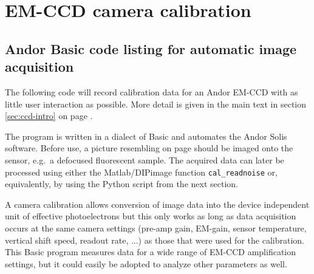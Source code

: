 \chapter{EM-CCD camera calibration}
\section{Andor Basic code listing for automatic image acquisition}
\label{sec:basic-acquisition}


The following code will record calibration data for an Andor EM-CCD
with as little user interaction as possible. More detail is given in
the main text in section \ref{sec:ccd-intro} on page
\pageref{sec:ccd-intro}.

The program is written in a dialect of Basic and automates the Andor Solis software.
Before use, a picture resembling
 on page \pageref{fig:shot-noise} should be
imaged onto the sensor, e.g.\ a defocused fluorescent sample. The
acquired data can later be processed using either the Matlab/DIPimage
function \verb!cal_readnoise! or, equivalently, by using the Python
script from the next section.

A camera calibration allows conversion of image data into the device
independent unit of effective photoelectrons but this only works as
long as data acquisition occurs at the same camera settings (pre-amp
gain, EM-gain, sensor temperature, vertical shift speed, readout rate,
...) as those that were used for the calibration. This Basic program
measures data for a wide range of EM-CCD amplification settings, but
it could easily be adopted to analyze other parameters as well.

